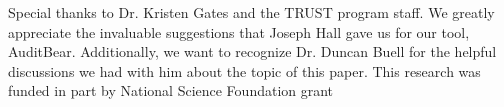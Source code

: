 Special thanks to Dr. Kristen Gates and the TRUST
program staff.  We greatly appreciate the invaluable suggestions that Joseph
Hall gave us for our tool, AuditBear.  Additionally, we want to recognize
Dr. Duncan Buell for the helpful discussions we had with him about the topic of
this paper. This research was funded in part by National Science Foundation
grant 
